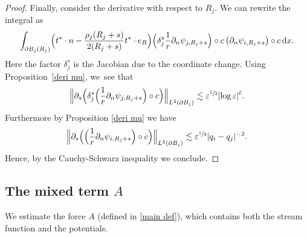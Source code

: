 \documentclass[JEP,XML,SOM,Unicode,published]{cedram}
\let\epsilon\varepsilon
\theoremstyle{definition}
\newcommand\Bnorm[1]{\Bigl\lVert #1\Bigr\rVert}
\newcommand\dd{\,\mathrm{d}}
\newcommand\dx{\dd x}
\let\de\partial
\let\eps\epsilon
\begin{document}
\begin{proof}
Finally, consider the derivative with respect to $R_j$.
We can rewrite the integral as
\begin{align*}
\int_{\de B_j(R_j)}\Bigl(t^*\cdot n-\frac{\rho_j(R_j+s)}{2(R_j+s)}t^*\cdot e_R\Bigr)\Bigl(\delta_j^s\frac{1}{r}\de_n\psi_{j,R_j+s}\Bigr)\circ c\left(\de_n\psi_{i,R_j+s}\right)\circ c\dx.
\end{align*}
Here the factor $\delta_j^s$ is the Jacobian due to the coordinate change.
Using Proposition~\ref{deri mu}, we~see that
\begin{align*}
\Bnorm{\de_s\Bigl(\delta_j^s\Bigl(\frac{1}{r}\de_n\psi_{j,R_j+s}\Bigr)\circ c\Bigr)}_{L^2(\de B_j)}\lesssim \eps^{\sfrac{1}{2}}|{\log\eps}|^\ell.
\end{align*}
Furthermore by Proposition \ref{deri mu} we have
\begin{align*}
\Bnorm{\de_s \Bigl(\Bigl(\frac{1}{r}\de_n\psi_{i,R_j+s} \Bigr)\circ c \Bigr)}_{L^2(\de B_j)}\lesssim \eps^{\sfrac{1}{2}}|q_i-q_j|^{-2}.
\end{align*}
Hence, by the Cauchy-Schwarz inequality we conclude.
\end{proof}

\subsection{The mixed term $A$}\label{subsec4.2}
We estimate the force $A$ (defined in \ref{main def}), which contains both the stream function and the potentials.
\end{document}

